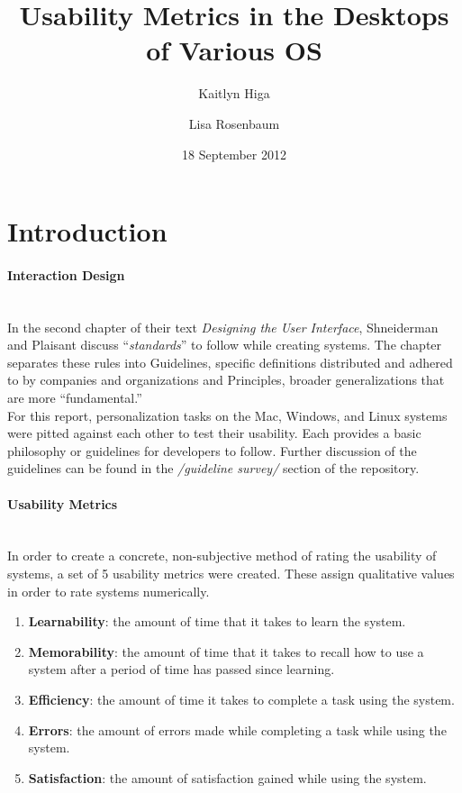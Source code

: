 \documentclass[12pt, onesided, letterpaper]{report}
\begin{document}
\title{Usability Metrics in the Desktops of Various OS}
\date{18 September 2012}
\author{Kaitlyn Higa \and Lisa Rosenbaum}
\maketitle


\section*{Introduction}
\paragraph*{Interaction Design}~\\

In the second chapter of their text \emph{Designing the User Interface}, Shneiderman and Plaisant discuss ``\emph{standards}'' to follow while creating systems.  The chapter separates these rules into Guidelines, specific definitions distributed and adhered to by companies and organizations and Principles, broader generalizations that are more ``fundamental.''  \\

For this report, personalization tasks on the Mac, Windows, and Linux systems were pitted against each other to test their usability.  Each provides a basic philosophy or guidelines for developers to follow.  Further discussion of the guidelines can be found in the \textit{/guideline survey/} section of the repository.  
\paragraph*{Usability Metrics} ~\\

In order to create a concrete, non-subjective method of rating the usability of systems, a set of 5 usability metrics were created.  These assign qualitative values in order to rate systems numerically. 
\begin{enumerate}
\item \textbf{Learnability}: the amount of time that it takes to learn the system.  
\item \textbf{Memorability}: the amount of time that it takes to recall how to use a system after a period of time has passed since learning.  
\item \textbf{Efficiency}: the amount of time it takes to complete a task using the system.
\item \textbf{Errors}: the amount of errors made while completing a task while using the system.
\item \textbf{Satisfaction}: the amount of satisfaction gained while using the system. 
\end{enumerate}
\end{document}
